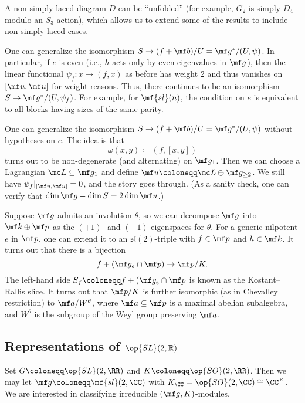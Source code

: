 \documentclass[../notes.tex]{subfiles}
\begin{document}
\begin{remark}
	A non-simply laced diagram $D$ can be ``unfolded'' (for example, $G_2$ is simply $D_4$ modulo an $S_3$-action), which allows us to extend some of the results to include non-simply-laced cases.
\end{remark}
\begin{remark}
	One can generalize the isomorphism $S\to(f+\mf b)/U=\mf g^*/(U,\psi)$. In particular, if $e$ is even (i.e., $h$ acts only by even eigenvalues in $\mf g$), then the linear functional $\psi_f\colon x\mapsto(f,x)$ as before has weight $2$ and thus vanishes on $[\mf u,\mf u]$ for weight reasons. Thus, there continues to be an isomorphism $S\to\mf g^*/(U,\psi_f)$. For example, for $\mf{sl}(n)$, the condition on $e$ is equivalent to all blocks having sizes of the same parity.
\end{remark}
\begin{remark}
	One can generalize the isomorphism $S\to(f+\mf b)/U=\mf g^*/(U,\psi)$ without hypotheses on $e$. The idea is that
	\[\omega(x,y)\coloneqq (f,[x,y])\]
	turns out to be non-degenerate (and alternating) on $\mf g_1$. Then we can choose a Lagrangian $\mc L\subseteq\mf g_1$ and define $\mf u\coloneqq\mc L\oplus\mf g_{\ge2}$. We still have $\psi_f|_{[\mf u,\mf u]}=0$, and the story goes through. (As a sanity check, one can verify that $\dim\mf g-\dim S=2\dim\mf u$.) %
\end{remark}
\begin{remark}
	Suppose $\mf g$ admits an involution $\theta$, so we can decompose $\mf g$ into $\mf k\oplus\mf p$ as the $(+1)$- and $(-1)$-eigenspaces for $\theta$. For a generic nilpotent $e$ in $\mf p$, one can extend it to an $\mathfrak{sl}(2)$-triple with $f\in\mf p$ and $h\in\mf k$. It turns out that there is a bijection
	\[f+(\mf g_e\cap\mf p)\to\mf p/K.\]
	The left-hand side $S_f\coloneqq f+(\mf g_e\cap\mf p$ is known as the Kostant--Rallis slice. It turns out that $\mf p/K$ is further isomorphic (as in Chevalley restriction) to $\mf a/W^\theta$, where $\mf a\subseteq\mf p$ is a maximal abelian subalgebra, and $W^\theta$ is the subgroup of the Weyl group preserving $\mf a$.
\end{remark}

\subsection{Representations of \texorpdfstring{$\op{SL}(2,\mathbb R)$}{SL(2,R)}}
Set $G\coloneqq\op{SL}(2,\RR)$ and $K\coloneqq\op{SO}(2,\RR)$. Then we may let $\mf g\coloneqq\mf{sl}(2,\CC)$ with $K_\CC=\op{SO}(2,\CC)\cong\CC^\times$. We are interested in classifying irreducible $(\mf g,K)$-modules.
\end{document}
